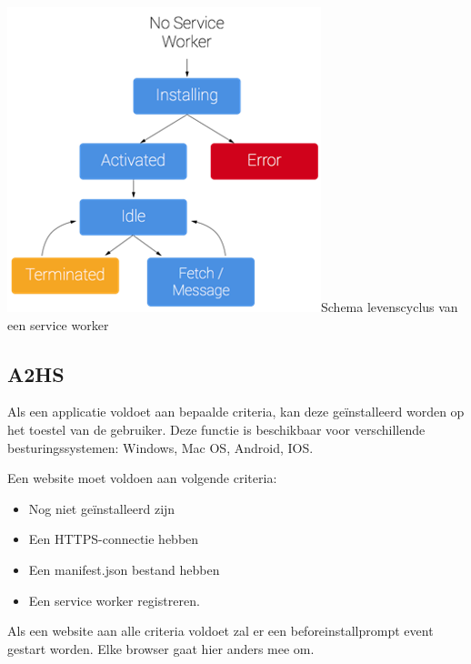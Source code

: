 \includegraphics{./img/ServiceWorkerLifeCycle.png}{Schema levenscyclus van een service worker \autocite{Gaunt2019}}




\subsection{A2HS}

Als een applicatie voldoet aan bepaalde criteria, kan deze geïnstalleerd worden op het toestel van de gebruiker. Deze functie is beschikbaar voor verschillende besturingssystemen: Windows, Mac OS, Android, IOS.

Een website moet voldoen aan volgende criteria:

\begin{itemize}
	\item	Nog niet geïnstalleerd zijn
	\item	Een HTTPS-connectie hebben
	\item	Een manifest.json bestand hebben
	\item	Een service worker registreren.
\end{itemize}

Als een website aan alle criteria voldoet zal er een beforeinstallprompt event gestart worden. Elke browser gaat hier anders mee om. 


